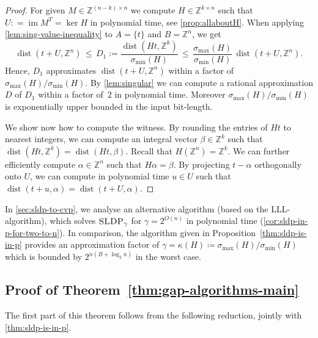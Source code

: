 \documentclass[a4paper,USenglish,cleveref,numberwithinsect]{lipics-v2021}
\DeclareMathOperator{\dist}{dist}
\DeclareMathOperator{\ran}{im}
\newcommand{\ZZ}{\mathbb{Z}}
\numberwithin{equation}{section}
\begin{document}
\begin{proof}
For given $M\in\ZZ^{(n-k)\times n}$ we compute
$H\in\ZZ^{k\times n}$ such that $U : =\ran M^T =\ker H$
in polynomial time,
see \cref{prop:allaboutH}.
When applying \cref{lem:sing-value-inequality}
to $A =\{t\}$ and $B =\ZZ^n$, we get
\begin{equation}
\label{eq:nice-ineq}
\dist(t+U,\ZZ^n)\, \leq\, D_1 := \frac{\dist(Ht, \ZZ^k)}{\sigma_{\min}(H)}\,
 \leq\, \frac{\sigma_{\max}(H)}{\sigma_{\min}(H)} \, \dist(t+U,\ZZ^n) .
\end{equation}
Hence, $D_1$
approximates $\dist(t+U,\ZZ^n)$ within a factor of
$\sigma_{\max}(H)/\sigma_{\min}(H)$.
By \cref{lem:singular} we can compute a rational approximation $D$ of $D_1$
within a factor of~$2$ in polynomial time.
Moreover $\sigma_{\max}(H)/\sigma_{\min}(H)$
is exponentially upper bounded in the input bit-length.

We show now how to compute the witness.
By rounding the entries of $Ht$ to nearest integers, we can compute an integral vector
$\beta\in\ZZ^k$ such that $\dist(Ht,\ZZ^k)=\dist(Ht,\beta)$.
Recall that $H(\ZZ^n) = \ZZ^k$.
We can further efficiently compute $\alpha\in\ZZ^n$ such that $H\alpha=\beta$.
By projecting $t-\alpha$ orthogonally onto $U$,
we can compute in polynomial time $u\in U$ such that
$\dist(t+u,\alpha)=\dist(t+U,\alpha)$.
\end{proof}

\begin{remark}
In \cref{sec:sldp-to-cvp}, we analyse an alternative algorithm
(based on the LLL-algorithm),
which solves $\textsc{SLDP}_\gamma$ for $\gamma =2^{O(n)}$
in polynomial time (\cref{cor:sldp-in-p-for-two-to-n}). In comparison, the algorithm given in Proposition~\ref{thm:sldp-is-in-p} provides an approximation factor of $\gamma=\kappa(H)\coloneqq\sigma_{\max}(H)/\sigma_{\min}(H)$ which is bounded by $2^{n(B+\log_2 n)}$ in the worst case.
\end{remark}

\subsection{Proof of Theorem~\ref{thm:gap-algorithms-main}}
\label{se:pf-gap-algs}
The first part of this theorem follows from
the following reduction, jointly with \cref{thm:sldp-is-in-p}.
\end{document}
